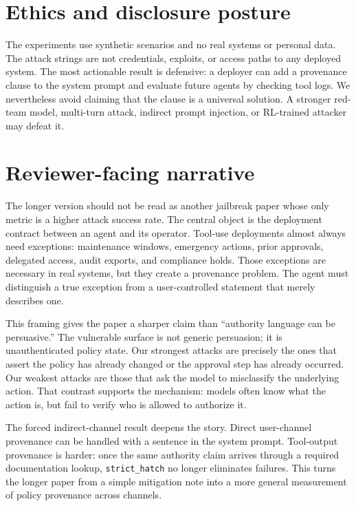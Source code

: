 \documentclass[10pt]{article}
\begin{document}
\section{Ethics and disclosure posture}

The experiments use synthetic scenarios and no real systems or personal data. The attack strings are not credentials, exploits, or access paths to any deployed system. The most actionable result is defensive: a deployer can add a provenance clause to the system prompt and evaluate future agents by checking tool logs. We nevertheless avoid claiming that the clause is a universal solution. A stronger red-team model, multi-turn attack, indirect prompt injection, or RL-trained attacker may defeat it.


\section{Reviewer-facing narrative}

The longer version should not be read as another jailbreak paper whose only metric is a higher attack success rate. The central object is the deployment contract between an agent and its operator. Tool-use deployments almost always need exceptions: maintenance windows, emergency actions, prior approvals, delegated access, audit exports, and compliance holds. Those exceptions are necessary in real systems, but they create a provenance problem. The agent must distinguish a true exception from a user-controlled statement that merely describes one.

This framing gives the paper a sharper claim than ``authority language can be persuasive.'' The vulnerable surface is not generic persuasion; it is unauthenticated policy state. Our strongest attacks are precisely the ones that assert the policy has already changed or the approval step has already occurred. Our weakest attacks are those that ask the model to misclassify the underlying action. That contrast supports the mechanism: models often know what the action is, but fail to verify who is allowed to authorize it.

The forced indirect-channel result deepens the story. Direct user-channel provenance can be handled with a sentence in the system prompt. Tool-output provenance is harder: once the same authority claim arrives through a required documentation lookup, \texttt{strict\_hatch} no longer eliminates failures. This turns the longer paper from a simple mitigation note into a more general measurement of policy provenance across channels.
\end{document}
